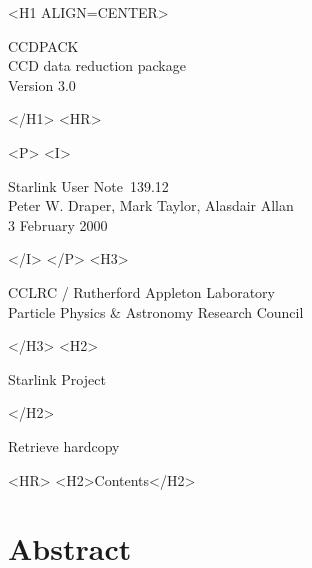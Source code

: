 \documentclass[twoside,11pt]{article}
\newcommand{\stardoccategory}  {Starlink User Note}
\newcommand{\stardocsource}    {sun\stardocnumber}
\newcommand{\stardocnumber}    {139.12}
\newcommand{\stardocauthors}   {Peter W. Draper, Mark Taylor, Alasdair Allan}
\newcommand{\stardocdate}      {3 February 2000}
\newcommand{\stardoctitle}     {CCDPACK}
\newcommand{\stardoconeline}   {CCD data reduction package}
\newcommand{\stardocversion}   {Version 3.0}
\newcommand{\htmladdnormallink}[2]{#1}
\newcommand{\htmladdimg}[1]{}
\newcommand{\htmlref}[2]{#1}
\newcommand{\htmladdtonavigation}[1]{}
\newcommand{\xlabel}[1]{}
\renewcommand{\_}{\texttt{\symbol{95}}}
\begin{document}
\begin{htmlonly}
   \xlabel{}
   \begin{rawhtml} <H1 ALIGN=CENTER> \end{rawhtml}
      \stardoctitle\\
      \stardoconeline \\
      \stardocversion

      \htmladdimg{main.gif}
   \begin{rawhtml} </H1> <HR> \end{rawhtml}


   \begin{rawhtml} <P> <I> \end{rawhtml}
   \stardoccategory\ \stardocnumber \\
   \stardocauthors \\
   \stardocdate
   \begin{rawhtml} </I> </P> <H3> \end{rawhtml}
      \htmladdnormallink{CCLRC}{http://www.cclrc.ac.uk} /
      \htmladdnormallink{Rutherford Appleton Laboratory}
                        {http://www.cclrc.ac.uk/ral} \\
      \htmladdnormallink{Particle Physics \& Astronomy Research Council}
                        {http://www.pparc.ac.uk} \\
   \begin{rawhtml} </H3> <H2> \end{rawhtml}
      \htmladdnormallink{Starlink Project}{http://star-www.rl.ac.uk/}
   \begin{rawhtml} </H2> \end{rawhtml}
   \htmladdnormallink{\htmladdimg{source.gif} Retrieve hardcopy}
      {http://star-www.rl.ac.uk/cgi-bin/hcserver?\stardocsource}\\

  \label{stardoccontents}
  \begin{rawhtml} 
    <HR>
    <H2>Contents</H2>
  \end{rawhtml}
  \htmladdtonavigation{\htmlref{\htmladdimg{contents_motif.gif}}
        {stardoccontents}}

  \section{\xlabel{abstract}Abstract}
\end{htmlonly}
\end{document}
